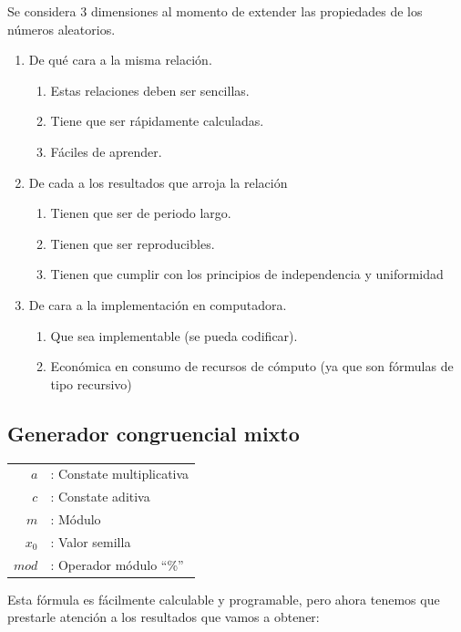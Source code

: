 \documentclass[11pt,letterpaper]{report}
\begin{document}
Se considera 3 dimensiones al momento de extender las propiedades de los números aleatorios.
\begin{enumerate}
\item De qué cara a la misma relación.
  \begin{enumerate}[label=\alph*.]
  \item Estas relaciones deben ser sencillas.
  \item Tiene que ser rápidamente calculadas.
  \item Fáciles de aprender.
  \end{enumerate}
\item De cada a los resultados que arroja la relación
  \begin{enumerate}[label=\alph*.]
  \item Tienen que ser de periodo largo.
  \item Tienen que ser reproducibles.
  \item Tienen que cumplir con los principios de independencia y uniformidad
  \end{enumerate}
\item De cara a la implementación en computadora.
  \begin{enumerate}[label=\alph*.]
  \item Que sea implementable (se pueda codificar).
  \item Económica en consumo de recursos de cómputo (ya que son fórmulas de tipo recursivo)
  \end{enumerate}
\end{enumerate}

\subsection*{Generador congruencial mixto}

\begin{center}
\end{center}

\begin{tabular}{rl}
$a$ & : Constate multiplicativa\\
$c$ & : Constate aditiva\\
$m$ & : Módulo\\
$x_0$ & : Valor semilla\\
$mod$ & : Operador módulo ``\%''
\end{tabular}

\vspace{0.3cm}
Esta fórmula es fácilmente calculable y programable, pero ahora tenemos que prestarle atención a los resultados que vamos a obtener:
\end{document}
